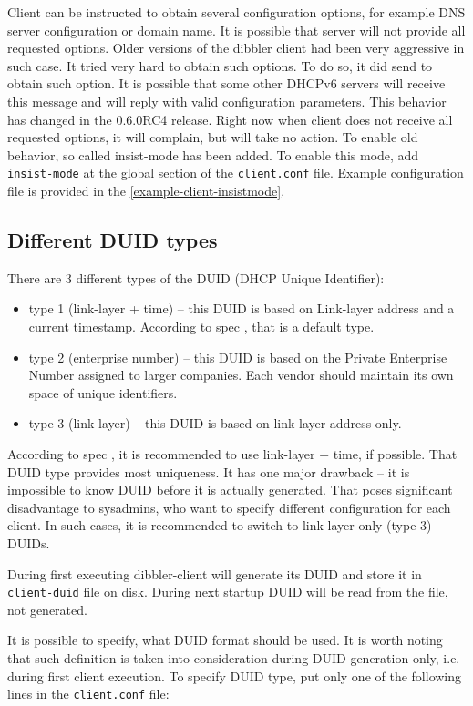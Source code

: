Client can be instructed to obtain several configuration options, for
example DNS server configuration or domain name. It is possible that server
will not provide all requested options. Older versions of
the dibbler client had been very aggressive in such case. It tried
very hard to obtain such options. To do so, it did send
 to obtain such option. It is possible that some
other DHCPv6 servers will receive this message and will reply with
valid configuration parameters. This behavior has
changed in the 0.6.0RC4 release. Right now when client does not
receive all requested options, it will complain, but will
take no action. To enable old behavior, so called insist-mode has been
added. To enable this mode, add \verb+insist-mode+ at the global
section of the \verb+client.conf+ file. Example configuration file is
provided in the \ref{example-client-insistmode}.

\subsection{Different DUID types}
\label{feature-duid-types}
There are 3 different types of the DUID (DHCP Unique Identifier):
\begin{itemize}
\item type 1 (link-layer + time) -- this DUID is based on Link-layer
  address and a current timestamp. According to spec \cite{rfc3315},
  that is a default type.
\item type 2 (enterprise number) -- this DUID is based on the Private
  Enterprise Number assigned to larger companies. Each vendor should
  maintain its own space of unique identifiers.
\item type 3 (link-layer) -- this DUID is based on link-layer address
  only.
\end{itemize}

According to spec \cite{rfc3315}, it is recommended to use link-layer
+ time, if possible. That DUID type provides most uniqueness. It has
one major drawback -- it is impossible to know DUID before it is
actually generated. That poses significant disadvantage to sysadmins,
who want to specify different configuration for each client. In such
cases, it is recommended to switch to link-layer only (type 3) DUIDs.

During first executing dibbler-client will generate its DUID and store
it in \verb+client-duid+ file on disk. During next startup DUID will
be read from the file, not generated. 

It is possible to specify, what DUID format should be used. It is
worth noting that such definition is taken into consideration during
DUID generation only, i.e. during first client execution. To specify
DUID type, put only one of the following lines in the
\verb+client.conf+ file:

